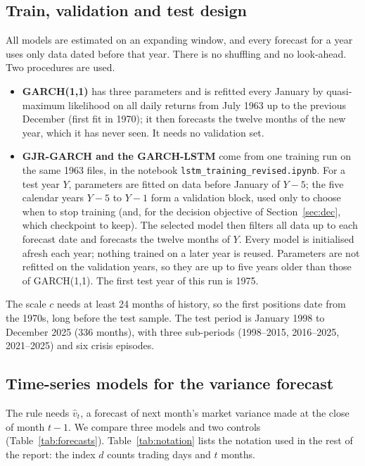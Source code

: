 \documentclass[12pt]{article}
\begin{document}
\subsection{Train, validation and test design}\label{sec:design}
All models are estimated on an expanding window, and every forecast for a year uses only data dated before that year. There is no shuffling and no look-ahead. Two procedures are used.
\begin{itemize}
\item \textbf{GARCH(1,1)} has three parameters and is refitted every January by quasi-maximum likelihood on all daily returns from July 1963 up to the previous December (first fit in 1970); it then forecasts the twelve months of the new year, which it has never seen. It needs no validation set.
\item \textbf{GJR-GARCH and the GARCH-LSTM} come from one training run on the same 1963 files, in the notebook \texttt{lstm\_training\_revised.ipynb}. For a test year $Y$, parameters are fitted on data before January of $Y-5$; the five calendar years $Y-5$ to $Y-1$ form a validation block, used only to choose when to stop training (and, for the decision objective of Section~\ref{sec:dec}, which checkpoint to keep). The selected model then filters all data up to each forecast date and forecasts the twelve months of $Y$. Every model is initialised afresh each year; nothing trained on a later year is reused. Parameters are not refitted on the validation years, so they are up to five years older than those of GARCH(1,1). The first test year of this run is 1975.
\end{itemize}
The scale $c$ needs at least 24 months of history, so the first positions date from the 1970s, long before the test sample. The test period is January 1998 to December 2025 (336 months), with three sub-periods (1998--2015, 2016--2025, 2021--2025) and six crisis episodes.

\FloatBarrier
\subsection{Time-series models for the variance forecast}
The rule needs $\hat v_t$, a forecast of next month's market variance made at the close of month $t-1$. We compare three models and two controls (Table~\ref{tab:forecasts}). Table~\ref{tab:notation} lists the notation used in the rest of the report: the index $d$ counts trading days and $t$ months.
\end{document}
